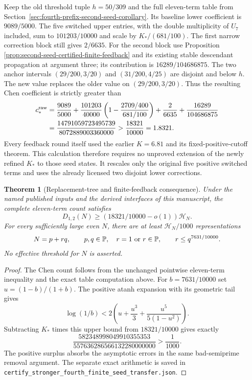 \documentclass[11pt]{article}
\newtheorem{theorem}{Theorem}
\newcommand{\PP}{\mathbb P}
\newcommand{\HN}{\mathcal H_N}
\begin{document}
Keep the old threshold tuple $h=50/309$ and the full eleven-term
table from Section~\ref{sec:fourth-prefix-second-seed-corollary}.
Its baseline lower coefficient is $9089/5000$. The five switched
upper entries, with the double multiplicity of $U_7$ included,
sum to $101203/10000$ and scale by $K_* /(681/100)$.
The first narrow correction block still gives $2/6635$.
For the second block use Proposition
\ref{prop:second-seed-certified-finite-feedback} and its existing
stable descendant propagation at argument three; its contribution
is $16289/104686875$. The two anchor intervals
$(29/200,3/20)$ and $(31/200,4/25)$ are disjoint and below $h$.
The new value replaces the older value on $(29/200,3/20)$.
Thus the resulting Chen coefficient is strictly greater than
\begin{align*}
 c_*^{\rm raw}
 &=\frac{9089}{5000}
 +\frac{101203}{40000}\left(1-\frac{2709/400}{681/100}\right)
 +\frac2{6635}+\frac{16289}{104686875}\\
 &=\frac{14791059723495739}{8072889003360000}
 >\frac{18321}{10000}=1.8321.
\end{align*}
Every feedback round itself used the earlier $K=6.81$ and its
fixed-positive-cutoff theorem. This calculation therefore requires
no unproved extension of the newly refined $K_*$ to those seed
states. It rescales only the original five positive switched terms
and uses the already licensed two disjoint lower corrections.

\begin{theorem}[Replacement-tree and finite-feedback consequence]
\label{thm:stronger-fourth-finite-seed-chen}
Under the named published inputs and the derived interfaces of
this manuscript, the complete eleven-term count satisfies
\[
 D_{1,2}(N)\ge(18321/10000-o(1))\HN.
\]
For every sufficiently large even $N$, there are at least
$\HN/1000$ representations
\[
 N=p+rq,\qquad p,q\in\PP,\quad r=1\ \hbox{or}\ r\in\PP,
 \qquad r\le q^{7631/10000}.
\]
No effective threshold for $N$ is asserted.
\end{theorem}

\begin{proof}
The Chen count follows from the unchanged pointwise eleven-term
inequality and the exact table computation above. For
$b=7631/10000$ set $u=(1-b)/(1+b)$. The positive atanh expansion
with its geometric tail gives
\[
 \log(1/b)<2\left(u+\frac{u^3}{3}
                          +\frac{u^5}{5(1-u^2)}\right).
\]
Subtracting $K_*$ times this upper bound from $18321/10000$ gives
exactly
\[
 \frac{582348998049910355353}{557636286566132280000000}
 >\frac1{1000}.
\]
The positive surplus absorbs the asymptotic errors in the same
bad-semiprime removal argument. The separate exact arithmetic is
saved in \texttt{certify\_stronger\_fourth\_finite\_seed\_transfer.json}.
\end{proof}
\end{document}
